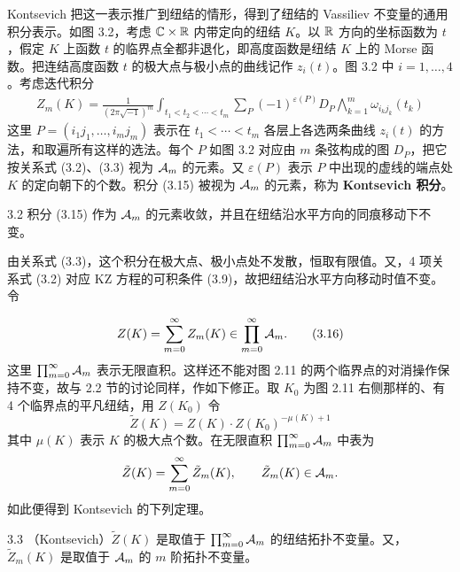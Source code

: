 Kontsevich 把这一表示推广到纽结的情形，得到了纽结的 Vassiliev 不变量的通用积分表示。如图 3.2，考虑 $\mathbb{C}\times\mathbb{R}$ 内带定向的纽结 $K$。以 $\mathbb{R}$ 方向的坐标函数为 $t$，假定 $K$ 上函数 $t$ 的临界点全都非退化，即高度函数是纽结 $K$ 上的 Morse 函数。把连结高度函数 $t$ 的极大点与极小点的曲线记作 $z_i(t)$。图 3.2 中 $i=1,\dots,4$。考虑迭代积分
\begin{equation}
\begin{aligned}
  Z_m(K)=\frac{1}{(2\pi\sqrt{-1})^{m}}
  \int_{t_1<t_2<\cdots<t_m}\sum_{P}(-1)^{\varepsilon(P)}D_{P}
  \bigwedge_{k=1}^{m}\omega_{i_kj_k}(t_k)
\end{aligned}
\tag{3.15}
\end{equation}
这里 $P=(i_1j_1,\dots,i_mj_m)$ 表示在 $t_1<\cdots<t_m$ 各层上各选两条曲线 $z_i(t)$ 的方法，和取遍所有这样的选法。每个 $P$ 如图 3.2 对应由 $m$ 条弦构成的图 $D_P$，把它按关系式 (3.2)、(3.3) 视为 $\mathcal{A}_m$ 的元素。又 $\varepsilon(P)$ 表示 $P$ 中出现的虚线的端点处 $K$ 的定向朝下的个数。积分 (3.15) 被视为 $\mathcal{A}_m$ 的元素，称为 \textbf{Kontsevich 积分}。

\begin{lemma}{3.2}
  积分 (3.15) 作为 $\mathcal{A}_m$ 的元素收敛，并且在纽结沿水平方向的同痕移动下不变。
\end{lemma}

由关系式 (3.3)，这个积分在极大点、极小点处不发散，恒取有限值。又，4 项关系式 (3.2) 对应 KZ 方程的可积条件 (3.9)，故把纽结沿水平方向移动时值不变。令

\begin{equation}
  Z(K)=\sum_{m=0}^{\infty}Z_m(K)\in\prod_{m=0}^{\infty}\mathcal{A}_m . \tag{3.16}
\end{equation}
这里 $\prod_{m=0}^{\infty}\mathcal{A}_m$ 表示无限直积。这样还不能对图 2.11 的两个临界点的对消操作保持不变，故与 2.2 节的讨论同样，作如下修正。取 $K_0$ 为图 2.11 右侧那样的、有 4 个临界点的平凡纽结，用 $Z(K_0)$ 令
\begin{equation}
  \tilde Z(K)=Z(K)\cdot Z(K_0)^{-\mu(K)+1} \tag{3.17}
\end{equation}
其中 $\mu(K)$ 表示 $K$ 的极大点个数。在无限直积 $\prod_{m=0}^{\infty}\mathcal{A}_m$ 中表为
\[
  \tilde Z(K)=\sum_{m=0}^{\infty}\tilde Z_m(K),\qquad \tilde Z_m(K)\in\mathcal{A}_m .
\]
如此便得到 Kontsevich 的下列定理。

\begin{theorem}{3.3}
  （Kontsevich）$\tilde Z(K)$ 是取值于 $\prod_{m=0}^{\infty}\mathcal{A}_m$ 的纽结拓扑不变量。又，$\tilde Z_m(K)$ 是取值于 $\mathcal{A}_m$ 的 $m$ 阶拓扑不变量。
\end{theorem}

